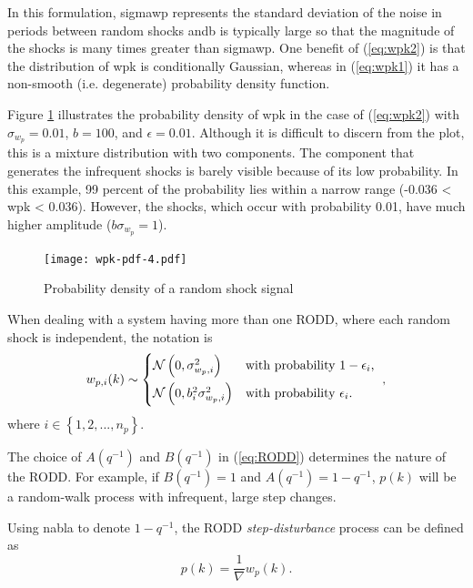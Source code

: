 In this formulation, \gls{sigmawp} represents the standard deviation of the noise in periods between random shocks and\gls{b} is typically large so that the magnitude of the shocks is many times greater than \gls{sigmawp}. One benefit of (\ref{eq:wpk2}) is that the distribution of \gls{wpk} is conditionally Gaussian, whereas in (\ref{eq:wpk1}) it has a non-smooth (i.e. degenerate) probability density function.

Figure \ref{fig:wpk-pdf} illustrates the probability density of \gls{wpk} in the case of (\ref{eq:wpk2}) with $\sigma_{w_p}=0.01$, $b=100$, and $\epsilon=0.01$. Although it is difficult to discern from the plot, this is a mixture distribution with two components. The component that generates the infrequent shocks is barely visible because of its low probability. In this example, 99 percent of the probability lies within a narrow range (-0.036 < \gls{wpk} < 0.036). However, the shocks, which occur with probability 0.01, have much higher amplitude ($b\sigma_{w_p}=1$).

\begin{figure}[htp]
	\centering
	\texttt{[image: wpk-pdf-4.pdf]}
	\caption{Probability density of a random shock signal}
	\label{fig:wpk-pdf}
\end{figure}

When dealing with a system having more than one RODD, where each random shock is independent, the notation is
\begin{equation} \label{eq:wpik2}
	w_{p,i}(k) \sim 
	\begin{cases*}
		\mathcal{N}\left(0, \sigma_{w_p,i}^2\right) & with probability $1-\epsilon_i$, \\
		\mathcal{N}\left(0, b_i^2\sigma_{w_p,i}^2\right) & with probability $\epsilon_i$.
	\end{cases*},
\end{equation}
where $i \in \left\{1, 2, ..., n_p\right\}$.

The choice of $A(q^{-1})$ and $B(q^{-1})$ in (\ref{eq:RODD}) determines the nature of the RODD. For example, if $B(q^{-1})=1$ and $A(q^{-1})=1-q^{-1}$, $p(k)$ will be a random-walk process with infrequent, large step changes.

Using \gls{nabla} to denote $1-q^{-1}$, the RODD \textit{step-disturbance} process can be defined as
\begin{equation} \label{eq:RODD-step}
	p(k)= \frac{1}{\nabla}w_p(k).
\end{equation}

